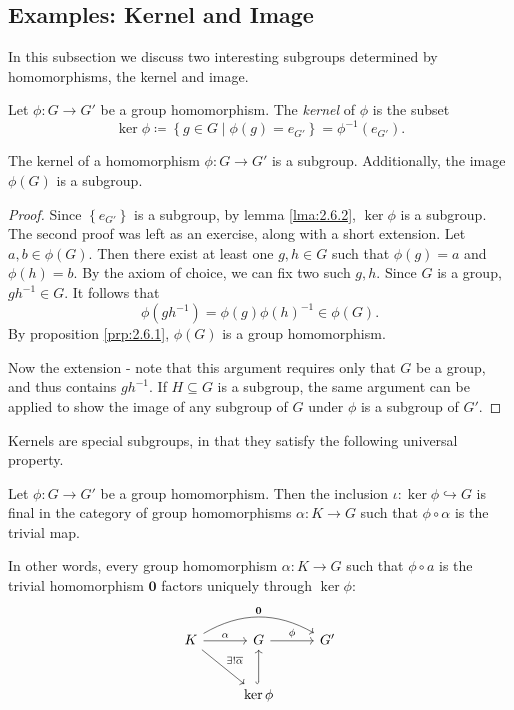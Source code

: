 \subsection{Examples: Kernel and Image}
In this subsection we discuss two interesting subgroups determined by homomorphisms, the kernel and image.
\begin{definition}[Kernel]\label{dfn:2.6.2}
	Let $\phi : G \to G'$ be a group homomorphism. The \emph{kernel} of $\phi $ is the subset
	\[
		\ker \phi \coloneqq \left\{ g\in G \mid \phi (g)=e_{G'} \right\} = \phi ^{-1}(e_{G'})
	.\]
\end{definition}
\begin{proposition}\label{prp:2.6.2}
	The kernel of a homomorphism $\phi : G \to G'$ is a subgroup. Additionally, the image $\phi (G)$ is a subgroup.
\end{proposition}
\begin{proof}
	Since $\left\{ e_{G'} \right\} $ is a subgroup, by lemma \ref{lma:2.6.2}, $\ker \phi $ is a subgroup. The second proof was left as an exercise, along with a short extension. Let $a,b\in \phi(G)$. Then there exist at least one $g,h\in G$ such that $\phi (g)=a$ and $\phi (h)=b$. By the axiom of choice, we can fix two such $g,h$. Since $G$ is a group,  $gh^{-1}\in G$. It follows that
	\[
		\phi (gh^{-1})=\phi (g)\phi (h)^{-1}\in \phi (G)
	.\]
	By proposition \ref{prp:2.6.1}, $\phi (G)$ is a group homomorphism.

	Now the extension - note that this argument requires only that $G$ be a group, and thus contains $gh^{-1}$. If $H\subseteq G$ is a subgroup, the same argument can be applied to show the image of any subgroup of $G$ under $\phi $ is a subgroup of $G'$.
\end{proof}
Kernels are special subgroups, in that they satisfy the following universal property.
\begin{proposition}\label{prp:2.6.3}
	Let $\phi : G \to G'$ be a group homomorphism. Then the inclusion $\iota : \ker \phi  \hookrightarrow G$ is final in the category of group homomorphisms $\alpha : K \to G$ such that $\phi \circ \alpha $ is the trivial map.
	
	In other words, every group homomorphism $\alpha : K \to G$ such that $\phi \circ a$ is the trivial homomorphism $\mathbf{0}$ factors uniquely through $\ker \phi $:
	\[\begin{tikzcd}[row sep=2.5em, column sep=2.5em]
		K\arrow[rr, bend left, "\mathbf{0}"]\arrow[dr, "\exists!\overline{\alpha}"]\arrow[r,"\alpha "]&G\arrow[r,"\phi "]&G'\\
													      &\ker \phi \arrow[u, hookrightarrow]
	\end{tikzcd}\]
\end{proposition}

